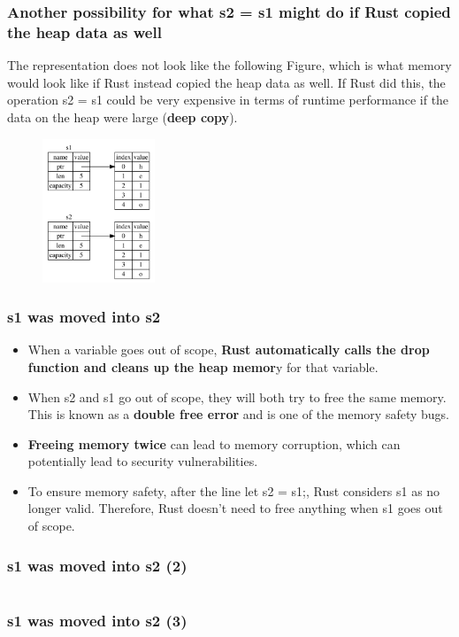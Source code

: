 \documentclass{beamer}
\begin{document}
\begin{frame}[fragile]
	\frametitle{Another possibility for what s2 = s1 might do if Rust copied the heap data as well}
	The representation does not look like the following Figure, which is what memory would look like if Rust instead copied the heap data as well. If Rust did this, the operation s2 = s1 could be very expensive in terms of runtime performance if the data on the heap were large (\textbf{deep copy}).
	\begin{figure}
		\centering
		\includegraphics[width=0.3\textwidth]{./img/trpl04-03.png}
		\label{fig:figureSAnotherPossibility}
	\end{figure}
\end{frame}

\begin{frame}[fragile]
	\frametitle{s1 was moved into s2}
\begin{itemize}
	\item When a variable goes out of scope, \textbf{Rust automatically calls the drop function and cleans up the heap memor}y for that variable. 
	\item When s2 and s1 go out of scope, they will both try to free the same memory. This is known as a \textbf{double free error} and is one of the memory safety bugs.
	\item \textbf{Freeing memory twice} can lead to memory corruption, which can potentially lead to security vulnerabilities.
	\item To ensure memory safety, after the line let s2 = s1;, Rust considers s1 as no longer valid. Therefore, Rust doesn’t need to free anything when s1 goes out of scope.
\end{itemize}

\end{frame}

\begin{frame}[fragile]
	\frametitle{s1 was moved into s2 (2)}
			\inputminted{rust}{./code/move-string.rs}
\end{frame}
\begin{frame}[fragile]
	\frametitle{s1 was moved into s2 (3)}
		\inputminted{shell}{./code/move-string.shell}
\end{frame}
\end{document}
